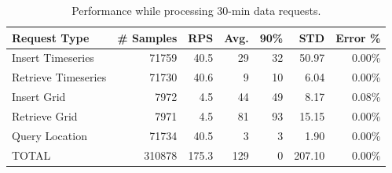 \documentclass[conference]{IEEEtran}
\begin{document}
\begin{table}[tb!]
\caption{Performance while processing 30-min data requests.}
\begin{center}
\begin{adjustbox}{width=0.45\textwidth}
\begin{tabular}{|l|r|r|r|r|r|r|}
\hline
\textbf{Request Type} & \textbf{\# Samples} & \textbf{RPS} & \textbf{Avg.} & \textbf{90\%} & \textbf{STD} & \textbf{Error \%} \\ \hline
Insert Timeseries & 71759 & 40.5 & 29 & 32 & 50.97 & 0.00\% \\ \hline
Retrieve Timeseries & 71730 & 40.6 & 9 & 10 & 6.04 & 0.00\% \\ \hline
Insert Grid & 7972 & 4.5 & 44 & 49 & 8.17 & 0.08\% \\ \hline
Retrieve Grid & 7971 & 4.5 & 81 & 93 & 15.15 & 0.00\% \\ \hline
Query Location & 71734 & 40.5 & 3 & 3 & 1.90 & 0.00\% \\ \hline
TOTAL & 310878 & 175.3 & 129 & 0 & 207.10 & 0.00\% \\ \hline
\end{tabular}
\end{adjustbox}
\label{ptab:obs_all_30_min_summary_throughput}
\end{center}
\end{table}
\end{document}
